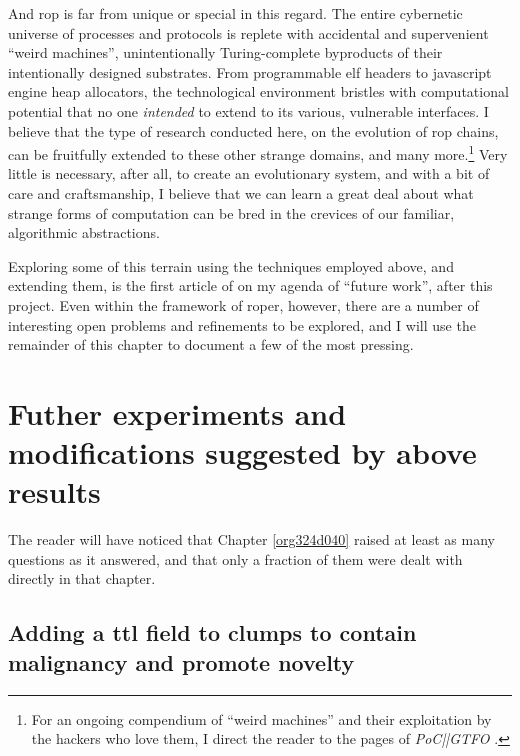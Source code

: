 \documentclass[12pt,glossary]{dalthesis}
\begin{document}
And \gls{rop} is far from unique or special in this regard. The entire cybernetic
universe of processes and protocols is replete with accidental and supervenient
``weird machines'', unintentionally Turing-complete byproducts of their intentionally
designed substrates. From programmable \gls{elf} headers to javascript engine heap
allocators, the technological environment bristles with computational potential
that no one \emph{intended} to extend to its various, vulnerable interfaces. I believe
that the type of research conducted here, on the evolution of \gls{rop} chains, can
be fruitfully extended to these other strange domains, and many more.\footnote{For an ongoing compendium of ``weird machines'' and their exploitation by the
  hackers who love them, I direct the reader to the pages of \emph{PoC||GTFO}
  \cite{pocorgtfo}.} Very little
is necessary, after all, to create an evolutionary system, and with a bit of care
and craftsmanship, I believe that we can learn a great deal about what strange
forms of computation can be bred in the crevices of our familiar, algorithmic
abstractions. 

Exploring some of this terrain using the techniques employed above, and
extending them, is the first article of on my agenda of ``future work'',
after this project. Even within the framework of \gls{roper}, however, there
are a number of interesting open problems and refinements to be explored,
and I will use the remainder of this chapter to document a few of the most
pressing.


\section{Futher experiments and modifications suggested by above results}
\label{sec:org60f32c5}

The reader will have noticed that Chapter \ref{org324d040} raised at least
as many questions as it answered, and that only a fraction of them were dealt
with directly in that chapter. 

\subsection{Adding a \gls{ttl} field to clumps to contain malignancy and promote novelty}
\label{sec:orgf4c2d03}
\end{document}
